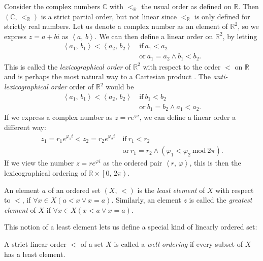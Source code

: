 \documentclass[../../main.tex]{subfiles}
\begin{document}
\begin{example}
    Consider the complex numbers $\mathbb{C}$ with $<_{\mathbb{R}}$ the usual order as defined on $\mathbb{R}$.
    Then $(\mathbb{C},\, <_{\mathbb{R}})$ is a strict partial order, but not linear since $<_{\mathbb{R}}$ is only defined for strictly real numbers.
    Let us denote a complex number as an element of $\mathbb{R}^2$, so we express $z = a + b i$ as $\left<a,\, b\right>$.
    We can then define a linear order on $\mathbb{R}^2$, by letting 
    \begin{align*}
        \left<a_1,\, b_1\right> < \left<a_2,\, b_2\right>\ &\text{if}\ a_1 < a_2 \\
        &\text{or}\ a_1 = a_2 \wedge b_1 < b_2.
    \end{align*}
    This is called the \textit{lexicographical order} of $\mathbb{R}^2$ with respect to the order $<$ on $\mathbb{R}$ and is perhaps the most natural way to a Cartesian product \cite[p.182]{Gol17}.
    The \textit{anti-lexicographical order} order of $\mathbb{R}^2$ would be 
    \begin{align*}
        \left<a_1,\, b_1\right> < \left<a_2,\, b_2\right>\ &\text{if}\ b_1 < b_2 \\
        &\text{or}\ b_1 = b_2 \wedge a_1 < a_2.
    \end{align*}
    If we express a complex number as $z = r e^{\varphi i}$, we can define a linear order a different way:
    \begin{align*}
        z_1 = r_1 e^{\varphi_1 i} < z_2 = r_2 e^{\varphi_2 i}\ &\text{if}\ r_1 < r_2 \\
        &\text{or}\ r_1 = r_2 \wedge (\varphi_1 < \varphi_2\ \text{mod}\ 2\pi).
    \end{align*}
    If we view the number $z = r e^{\varphi i}$ as the ordered pair $\left<r,\, \varphi\right>$, this is then the lexicographical ordering of $\mathbb{R} \times \left[0,\, 2 \pi\right)$.
\end{example}

\begin{definition}\cite[p.12]{Jec78}
    An element $a$ of an ordered set $\left(X,\, <\right)$ is the \textit{least element} of $X$ with respect to $<$, if $\forall x \in X  \left(a < x \vee x = a\right)$.
    Similarly, an element $z$ is called the \textit{greatest element} of $X$ if $\forall x \in X  \left(x < a \vee x = a\right)$.
\end{definition}

This notion of a least element lets us define a special kind of linearly ordered set:
\begin{definition}\cite[p.13]{Jec78}
    A strict linear order $<$ of a set $X$ is called a \textit{well-ordering} if every subset of $X$ has a least element.
\end{definition}
\end{document}
